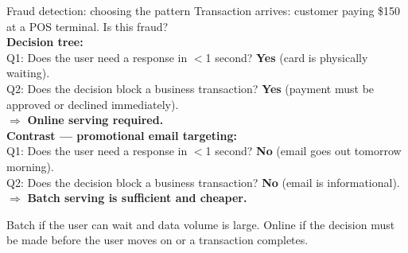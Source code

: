 \documentclass[a4paper,11pt]{article}
\begin{document}
\begin{worked}{Fraud detection: choosing the pattern}
Transaction arrives: customer paying \$150 at a POS terminal. Is this fraud? \\[4pt]
\textbf{Decision tree:} \\
Q1: Does the user need a response in $<$1 second? \textbf{Yes} (card is physically waiting). \\
Q2: Does the decision block a business transaction? \textbf{Yes} (payment must be approved or declined immediately). \\
$\Rightarrow$ \textbf{Online serving required.} \\[4pt]
\textbf{Contrast --- promotional email targeting:} \\
Q1: Does the user need a response in $<$1 second? \textbf{No} (email goes out tomorrow morning). \\
Q2: Does the decision block a business transaction? \textbf{No} (email is informational). \\
$\Rightarrow$ \textbf{Batch serving is sufficient and cheaper.}
\end{worked}

\begin{keytake}
Batch if the user can wait and data volume is large. Online if the decision must be made before the user moves on or a transaction completes.
\end{keytake}
\end{document}
